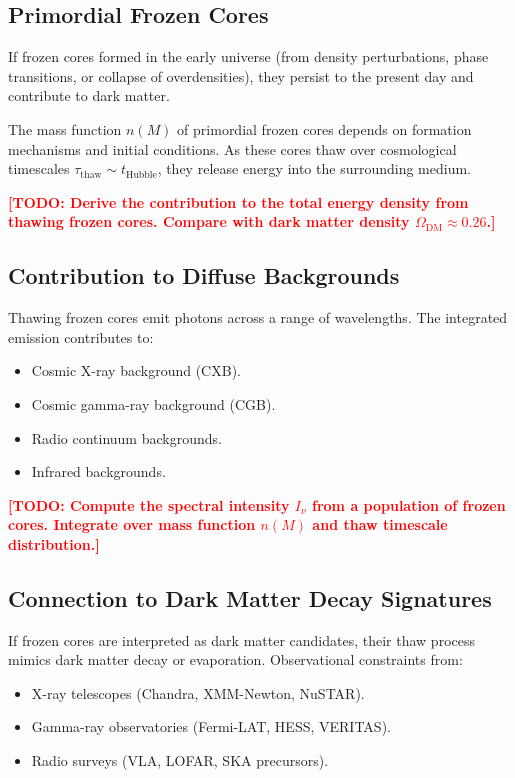 \documentclass[11pt,a4paper]{article}
\newcommand{\TODO}[1]{\textcolor{red}{\textbf{[TODO: #1]}}}
\theoremstyle{definition}
\theoremstyle{remark}
\begin{document}
\subsection{Primordial Frozen Cores}
\label{sec:primordial_cores}

If frozen cores formed in the early universe (from density perturbations, phase transitions, or collapse of overdensities), they persist to the present day and contribute to dark matter.

\vspace{0.5em}
\noindent
The mass function $n(M)$ of primordial frozen cores depends on formation mechanisms and initial conditions. As these cores thaw over cosmological timescales $\tau_{\mathrm{thaw}} \sim t_{\mathrm{Hubble}}$, they release energy into the surrounding medium.

\TODO{Derive the contribution to the total energy density from thawing frozen cores. Compare with dark matter density $\Omega_{\mathrm{DM}} \approx 0.26$.}

\subsection{Contribution to Diffuse Backgrounds}
\label{sec:diffuse_backgrounds}

Thawing frozen cores emit photons across a range of wavelengths. The integrated emission contributes to:
\begin{itemize}[leftmargin=*, itemsep=0.3em]
\item Cosmic X-ray background (CXB).
\item Cosmic gamma-ray background (CGB).
\item Radio continuum backgrounds.
\item Infrared backgrounds.
\end{itemize}

\TODO{Compute the spectral intensity $I_\nu$ from a population of frozen cores. Integrate over mass function $n(M)$ and thaw timescale distribution.}

\subsection{Connection to Dark Matter Decay Signatures}
\label{sec:dm_decay}

If frozen cores are interpreted as dark matter candidates, their thaw process mimics dark matter decay or evaporation. Observational constraints from:
\begin{itemize}[leftmargin=*, itemsep=0.3em]
\item X-ray telescopes (Chandra, XMM-Newton, NuSTAR).
\item Gamma-ray observatories (Fermi-LAT, HESS, VERITAS).
\item Radio surveys (VLA, LOFAR, SKA precursors).
\end{itemize}
\end{document}
